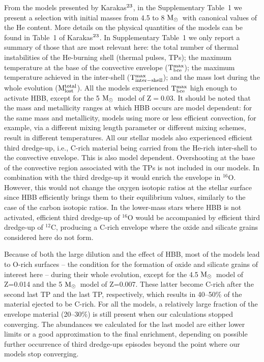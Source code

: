 \documentclass{nature}
\newcommand{\iso}[2]{\hbox{${}^{#1}${#2}}}
\newcommand{\msun}{\ensuremath{{\rm M}_{\odot}}}
\begin{document}
\begin{methods}
From the models presented by Karakas$^{\mbox{\scriptsize 23\if@tempswa , 1\fi}}$,
in the Supplementary Table~1
we present a selection with 
initial masses from 4.5 to 8 \msun\ with canonical values of the He content. 
More details on the physical quantities of the models can be found 
in Table~1 of Karakas$^{\mbox{\scriptsize 23\if@tempswa , 1\fi}}$.
In Supplementary Table~1 we only report a summary of 
those that are most relevant here: the total number of thermal instabilities of the He-burning shell 
(thermal pulses, TPs); 
the maximum temperature at the base of the 
convective envelope (${\rm T}^{\rm max}_{\rm bce}$); the maximum temperature achieved in the inter-shell 
(${\rm T}^{\rm max}_{\rm inter-shell}$); and 
the mass lost during the whole evolution (${\rm M}_{\rm lost}^{\rm total}$).
All the models experienced ${\rm T}^{\rm max}_{\rm bce}$ high 
enough to activate HBB, except for the 5 \msun\, model of Z$=0.03$.
It should be noted that the mass and
metallicity ranges at which HBB occurs are model dependent: for the same mass and metallicity,
models using more or less efficient convection, for example, via a different 
mixing length parameter or different mixing schemes, result in different 
temperatures\cite{ventura13,cristallo15}.
All our stellar models also experienced efficient third dredge-up, i.e., 
C-rich material being carried from 
the He-rich inter-shell to the convective envelope. This is also model
dependent.  
Overshooting at the base of the convective region associated with the TPs
is not included in our models. In combination with the 
third dredge-up it would enrich the envelope in \iso{16}O. However, 
this would not change the oxygen isotopic ratios at the stellar surface since 
HBB efficiently brings them  
to their equilibrium values, similarly to the case of the carbon isotopic ratios. 
In the lower-mass stars where HBB is not activated, efficient third dredge-up of 
\iso{16}O would be accompanied by efficient third dredge-up of 
\iso{12}C, producing a C-rich envelope where the oxide and silicate grains considered here 
do not form.

Because of both the large dilution and the effect of HBB, most of the models  
lead to O-rich surfaces -- the 
condition for the formation of oxide and silicate grains of interest here -- during their whole evolution, 
except for the 4.5 \msun\, model of Z=0.014 and the
5 \msun\, model of Z=0.007. These latter become C-rich after the 
second last TP and the last TP, respectively, which results in 40--50\% of the 
material ejected to be C-rich. For all the models, 
a relatively large fraction of the envelope material 
(20--30\%) is still present when our calculations stopped 
converging. The abundances we calculated for the last model are either lower
limits or a good approximation to the final enrichment, depending on 
possible further occurrence 
of third dredge-ups episodes beyond the point where our models stop converging.


\end{methods}
\end{document}
